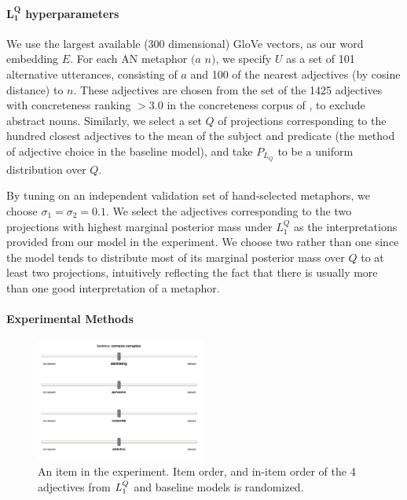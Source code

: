 \documentclass[9pt,twocolumn,twoside,lineno]{pnas-new}
\newcommand{\Listener}{L}
\newcommand{\QLONE}{\Listener_{{1}}^{{Q}}}
\begin{document}
{	%
	\paragraph{$\mathbf{\QLONE}$ hyperparameters}

		We use the largest available (300 dimensional) GloVe vectors, as our word embedding $E$. For each AN metaphor $(a$ $n)$, we specify $U$ as a set of 101 alternative utterances, consisting of $a$ and 100 of the nearest adjectives (by cosine distance) to $n$. These adjectives are chosen from the set of the 1425 adjectives with concreteness ranking $>3.0$ in the concreteness corpus of \cite{brysbaert2014concreteness}, to exclude abstract nouns.
		Similarly, we select a set $Q$ of projections corresponding to the hundred closest adjectives to the mean of the subject and predicate (the method of adjective choice in the baseline model), and take $P_{L_Q}$ to be a uniform distribution over $Q$. 

		By tuning on an independent validation set of hand-selected metaphors, we choose $\sigma_1=\sigma_2=0.1$. We select the adjectives corresponding to the two projections with highest marginal posterior mass under $\QLONE$ as the interpretations provided from our model in the experiment. We choose two rather than one since the model tends to distribute most of its marginal posterior mass over $Q$ to at least two projections, intuitively reflecting the fact that there is usually more than one good interpretation of a metaphor.

\paragraph{Experimental Methods}

\begin{figure}
\includegraphics[width=0.5\textwidth]{images/slide.png}
\caption{An item in the experiment. Item order, and in-item order of the 4 adjectives from $\protect\QLONE$ and baseline models is randomized.}
\label{fig:slide}
\end{figure}

}
\end{document}
